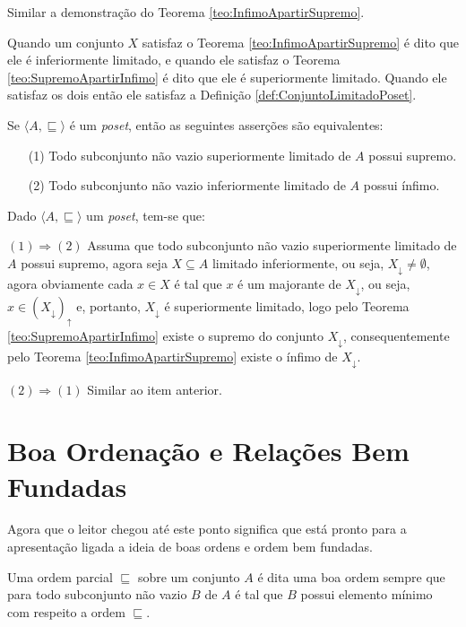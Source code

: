 \begin{prova}
	Similar a demonstração do Teorema \ref{teo:InfimoApartirSupremo}.
\end{prova}

Quando um conjunto $X$ satisfaz o Teorema  \ref{teo:InfimoApartirSupremo} é dito que ele é inferiormente limitado, e quando ele satisfaz o Teorema \ref{teo:SupremoApartirInfimo} é dito que ele é superiormente limitado. Quando ele satisfaz os dois então ele satisfaz a Definição \ref{def:ConjuntoLimitadoPoset}.

\begin{teorema}
	Se $\langle A, \sqsubseteq \rangle$ é um \textit{poset}, então as seguintes asserções são equivalentes:
	\begin{itemize}
		\item[(1)] Todo subconjunto não vazio superiormente limitado de $A$ possui supremo.
		\item[(2)] Todo subconjunto não vazio inferiormente limitado de $A$ possui ínfimo.
	\end{itemize}
\end{teorema}
	
\begin{prova}
	Dado $\langle A, \sqsubseteq \rangle$ um \textit{poset}, tem-se que:
	
	$(1) \Rightarrow (2)$ Assuma que todo subconjunto não vazio superiormente limitado de $A$ possui supremo, agora seja $X \subseteq A$ limitado inferiormente, ou seja, $X_\downarrow \neq \emptyset$, agora obviamente cada $x \in X$ é tal que $x$ é um majorante de $X_\downarrow$, ou seja, $x \in (X_\downarrow)_\uparrow$ e, portanto, $X_\downarrow$ é superiormente limitado, logo pelo Teorema \ref{teo:SupremoApartirInfimo} existe o supremo do conjunto $X_\downarrow$, consequentemente pelo Teorema \ref{teo:InfimoApartirSupremo} existe o ínfimo de $X_\downarrow$.
	
	$(2) \Rightarrow (1)$ Similar ao item anterior.
\end{prova}

\section{Boa Ordenação e Relações Bem Fundadas}\label{sec:BoaOrdem}

Agora que o leitor chegou até este ponto significa que está pronto para a apresentação ligada a ideia de boas ordens e ordem bem fundadas.

\begin{definicao}\label{def:BoaOrdem}
	Uma ordem parcial $\sqsubseteq$ sobre um conjunto $A$ é dita uma boa ordem sempre que para todo subconjunto não vazio $B$ de $A$ é tal que $B$ possui elemento mínimo com respeito a ordem $\sqsubseteq$.
\end{definicao}

